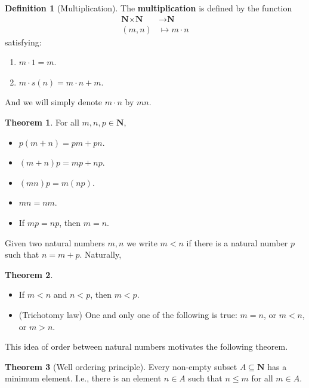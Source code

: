 \documentclass[12pt,a4paper]{article}
\theoremstyle{definition}
\newtheorem{theorem}{Theorem}[section]
\newtheorem{definition}{Definition}[section]
\begin{document}
\begin{definition}[Multiplication]
	The \textbf{multiplication} is defined by the function
		\begin{equation*}
		\begin{aligned}
			\textbf{N} \times \textbf{N} & \longrightarrow \textbf{N} \\
			(m,n) & \mapsto	m \cdot n
		\end{aligned}
	\end{equation*}
	satisfying:
	\begin{enumerate}
		\item $m \cdot 1 = m$.
		\item $m \cdot s(n) = m \cdot n + m$.
	\end{enumerate}
\end{definition}

And we will simply denote $m \cdot n$ by $mn$.

\begin{theorem}
	For all $m,n,p \in \textbf{N}$,
	\begin{itemize}
		\item $p(m+n) = pm+pn$.
		\item $(m+n)p = mp+np$.
		\item $(mn)p = m(np)$.
		\item $mn = nm$.
		\item If $mp=np$, then $m=n$.
	\end{itemize}
\end{theorem}

Given two natural numbers $m,n$ we write $m < n$ if there is a natural number $p$ such that $n = m+p$. Naturally,

\begin{theorem} \hfill
	\begin{itemize}
		\item If $m<n$ and $n<p$, then $m<p$.
		\item (Trichotomy law) One and only one of the following is true: $m = n$, or $m < n$, or $m>n$.
	\end{itemize}
\end{theorem}

This idea of order between natural numbers motivates the following theorem.

\begin{theorem}[Well ordering principle]
	Every non-empty subset $A \subseteq \textbf{N}$ has a minimum element. I.e., there is an element $n \in A$ such that $n \leq m$ for all $m \in A$.
\end{theorem}
\end{document}
